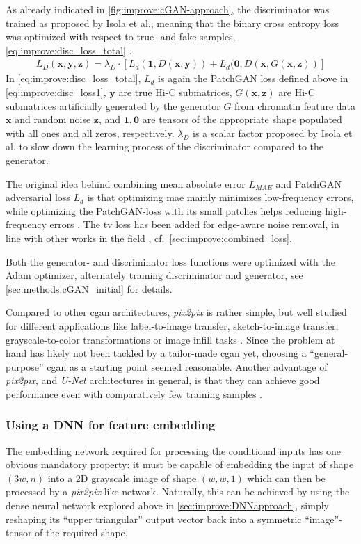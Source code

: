 As already indicated in \cref{fig:improve:cGAN-approach}, the discriminator was trained as proposed by Isola et al.,
meaning that the binary cross entropy loss was optimized with respect to true- and fake samples, \cref{eq:improve:disc_loss_total} .
\begin{align}
 L_D(\mathbf{x,y,z}) = \lambda_D \cdot \left[ L_d(\mathbf{1}, D(\mathbf{x,y})) + L_d(\mathbf{0}, D(\mathbf{x},G(\mathbf{x, z})) \right] \label{eq:improve:disc_loss_total}
\end{align}
In \cref{eq:improve:disc_loss_total}, $L_d$ is again the PatchGAN loss defined above in \cref{eq:improve:disc_loss1}, $\bm{y}$ are true Hi-C submatrices, 
$G(\bm{x},\bm{z})$ are Hi-C submatrices artificially generated by the generator $G$
from chromatin feature data $\bm{x}$ and random noise $\bm{z}$, and $\mathbf{1}, \mathbf{0}$ are tensors of the appropriate shape populated with all ones and all zeros, respectively.
$\lambda_D$ is a scalar factor proposed by Isola et al. to slow down the learning process of the discriminator compared to the generator.

The original idea behind combining mean absolute error $L_\mathit{MAE}$ and PatchGAN adversarial loss $L_d$ is that optimizing \acrshort{mae}
mainly minimizes low-frequency errors, while optimizing the PatchGAN-loss with its small patches helps reducing high-frequency errors \cite{Isola2017}.
The \acrshort{tv} loss has been added for edge-aware noise removal, in line with other works in the field \cite{Hong2020}, cf.~\cref{sec:improve:combined_loss}.

Both the generator- and discriminator loss functions were optimized with the Adam optimizer,
alternately training discriminator and generator, see \cref{sec:methods:cGAN_initial} for details.

Compared to other \acrshort{cgan} architectures, \emph{pix2pix} is rather simple, but well studied for different applications like label-to-image transfer,
sketch-to-image transfer, grayscale-to-color transformations or image infill tasks \cite{Isola2017}.
Since the problem at hand has likely not been tackled by a tailor-made \acrshort{cgan} yet, 
choosing a ``general-purpose'' \acrshort{cgan} as a starting point seemed reasonable.
Another advantage of \emph{pix2pix}, and \emph{U-Net} architectures in general, 
is that they can achieve good performance even with comparatively few training samples \cite{Isola2017, Ronneberger2015}.

\subsubsection{Using a DNN for feature embedding} \label{sec:improve:DNN_embedding}
The embedding network required for processing the conditional inputs
has one obvious mandatory property: it must be capable of embedding the input of shape $(3w,n)$ 
into a 2D grayscale image of shape $(w,w,1)$ which can then be processed by a \emph{pix2pix}-like network.
Naturally, this can be achieved by using the dense neural network explored above in \cref{sec:improve:DNNapproach},
simply reshaping its ``upper triangular'' output vector back into a symmetric ``image''-tensor of the required shape.

